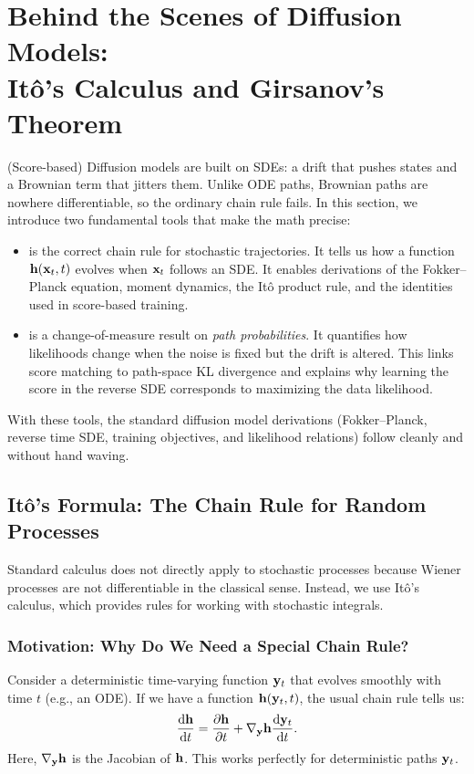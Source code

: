 \chapter{Behind the Scenes of Diffusion Models:\\ It\^o’s Calculus and Girsanov's Theorem}\label{app:Ito}


(Score-based) Diffusion models are built on SDEs: a drift that pushes states and a Brownian term that jitters them. Unlike ODE paths, Brownian paths are nowhere differentiable, so the ordinary chain rule fails. In this section, we introduce two fundamental tools that make the math precise:
\begin{itemize}
\item {} is the correct chain rule for stochastic trajectories. It tells us how a function ${\mathbf{h}}({\mathbf{x}}_t,t)$ evolves when ${\mathbf{x}}_t$ follows an SDE. It enables derivations of the Fokker–Planck equation, moment dynamics, the It\^o product rule, and the identities used in score-based training.
\item {} is a change-of-measure result on \emph{path probabilities}. It quantifies how likelihoods change when the noise is fixed but the drift is altered. This links score matching to path-space KL divergence and explains why learning the score in the reverse SDE corresponds to maximizing the data likelihood.
\end{itemize}

With these tools, the standard diffusion model derivations (Fokker–Planck, reverse time SDE, training objectives, and likelihood relations) follow cleanly and without hand waving.


\newpage


\section{It\^o's Formula: The Chain Rule for Random Processes}
Standard calculus does not directly apply to stochastic processes because Wiener processes are not differentiable in the classical sense. Instead, we use It\^o’s calculus, which provides rules for working with stochastic integrals. 

\subsection{Motivation: Why Do We Need a Special Chain Rule?}
Consider a deterministic time-varying function ${\mathbf{y}}_t$ that evolves smoothly with time $t$ (e.g., an ODE). If we have a function ${\mathbf{h}}({\mathbf{y}}_t, t)$, the usual chain rule tells us:
\[
\frac{\mathop{}\!\mathrm{d} {\mathbf{h}}}{\mathop{}\!\mathrm{d} t} = \frac{\partial {\mathbf{h}}}{\partial t}  + \nabla_{{\mathbf{y}}}{\mathbf{h}}  \frac{\mathop{}\!\mathrm{d} {\mathbf{y}}_t}{\mathop{}\!\mathrm{d} t} .
\]
Here, $\nabla_{{\mathbf{y}}}{\mathbf{h}}$ is the Jacobian of ${\mathbf{h}}$. This works perfectly for deterministic paths ${\mathbf{y}}_t$.

